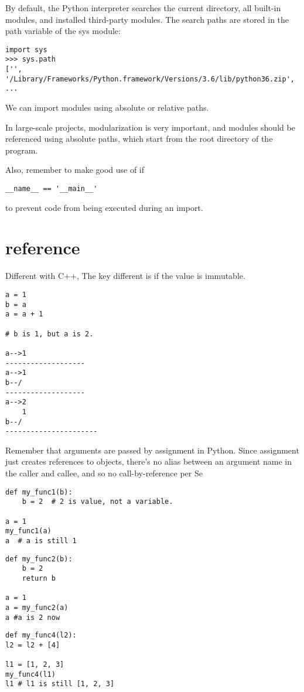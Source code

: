 \documentclass[a4paper,12pt,twoside]{book}
\begin{document}
By default, the Python interpreter searches the current directory, all built-in modules, and installed third-party modules. The search paths are stored in the path variable of the sys module:

\begin{lstlisting}
import sys
>>> sys.path
['', '/Library/Frameworks/Python.framework/Versions/3.6/lib/python36.zip', ...
\end{lstlisting}

We can import modules using absolute or relative paths. 

In large-scale projects, modularization is very important, and modules should be referenced using absolute paths, which start from the root directory of the program.

Also, remember to make good use of if
\begin{lstlisting}
__name__ == '__main__' 
\end{lstlisting}
to prevent code from being executed during an import.

\section{reference}

Different with C++, The key different is if the value is immutable.
\begin{lstlisting}
a = 1
b = a
a = a + 1

# b is 1, but a is 2. 

a-->1
-------------------
a-->1
b--/
-------------------
a-->2
    1
b--/
----------------------
\end{lstlisting}

Remember that arguments are passed by assignment in Python. Since assignment just creates references to objects, there’s no alias between an argument name in the caller and callee, and so no call-by-reference per Se
\begin{lstlisting}
def my_func1(b):
	b = 2  # 2 is value, not a variable.

a = 1
my_func1(a)
a  # a is still 1
\end{lstlisting}

\begin{lstlisting}
def my_func2(b):
	b = 2
	return b

a = 1
a = my_func2(a)
a #a is 2 now
\end{lstlisting}

\begin{lstlisting}
def my_func4(l2):
l2 = l2 + [4]

l1 = [1, 2, 3]
my_func4(l1)
l1 # l1 is still [1, 2, 3]
\end{lstlisting}
\end{document}
